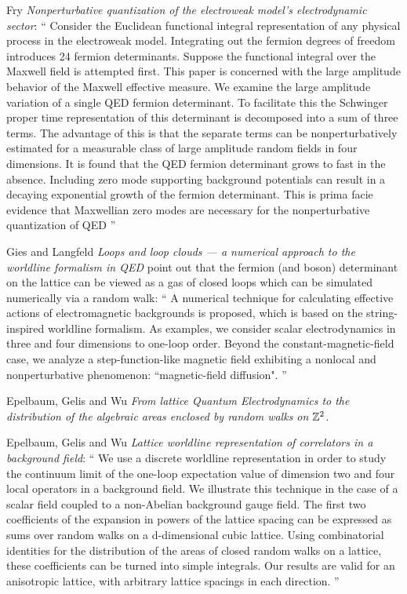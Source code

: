 \begin{description}
Fry {\em Nonperturbative quantization of the electroweak model's
electrodynamic sector}: `` Consider the Euclidean functional integral
representation of any physical process in the electroweak model. Integrating
out the fermion degrees of freedom introduces 24 fermion determinants.
Suppose the functional integral over the Maxwell field is attempted first.
This paper is concerned with the large amplitude behavior of the Maxwell
effective measure. We examine the large amplitude variation of a single QED
fermion determinant. To facilitate this the Schwinger proper time
representation of this determinant is decomposed into a sum of three terms.
The advantage of this is that the separate terms can be nonperturbatively
estimated for a measurable class of large amplitude random fields in four
dimensions. It is found that the QED fermion determinant grows to fast in the
absence. Including zero mode supporting background potentials can result in a
decaying exponential growth of the fermion determinant. This is prima facie
evidence that Maxwellian zero modes are necessary for the nonperturbative
quantization of QED
''

Gies and Langfeld {\em Loops and loop clouds — a numerical
approach to the worldline formalism in {QED}}
point out that the fermion (and boson) determinant on the lattice can be
viewed as a gas of closed loops which can be simulated numerically via a
random walk: ``
A numerical technique for calculating effective actions of electromagnetic
backgrounds is proposed, which is based on the string-inspired worldline
formalism. As examples, we consider scalar electrodynamics in three and four
dimensions to one-loop order. Beyond the constant-magnetic-field case, we
analyze a step-function-like magnetic field exhibiting a nonlocal and
nonperturbative phenomenon: ``magnetic-field diffusion".
''


Epelbaum, Gelis and Wu
{\em From lattice Quantum Electrodynamics to the distribution of
    the algebraic areas enclosed by random walks on $\mathbb{Z}^2$}.


Epelbaum, Gelis and Wu
{\em Lattice worldline representation of correlators in a background field}: ``
We use a discrete worldline representation in order to study the continuum
limit of the one-loop expectation value of dimension two and four local
operators in a background field. We illustrate this technique in the case of
a scalar field coupled to a non-Abelian background gauge field. The first two
coefficients of the expansion in powers of the lattice spacing can be
expressed as sums over random walks on a d-dimensional cubic lattice. Using
combinatorial identities for the distribution of the areas of closed random
walks on a lattice, these coefficients can be turned into simple integrals.
Our results are valid for an anisotropic lattice, with arbitrary lattice
spacings in each direction.
''


\end{description}
